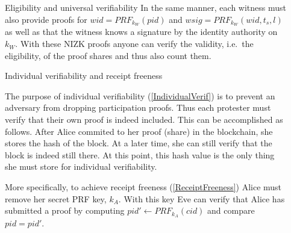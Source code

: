 \begin{columns}[t]
\begin{column}{0.32\linewidth}
\begin{blackblock}{Eligibility and universal verifiability}
In the same manner, each witness must also provide  proofs for \(wid = 
  PRF_{k_W}(pid)\) and \(wsig = PRF_{k_W}(wid, t_s, l)\) as well as that the 
witness knows a signature by the identity authority on \(k_W\).
With these \ac{NIZK} proofs anyone can verify the validity, i.e.\ the 
eligibility, of the proof shares and thus also count them.

\end{blackblock}

\begin{blackblock}{Individual verifiability and receipt freeness}

The purpose of individual verifiability (\cref{IndividualVerif}) is to prevent 
an adversary from dropping participation proofs.
Thus each protester must verify that their own proof is indeed included.
This can be accomplished as follows.
After Alice commited to her proof (share) in the blockchain, she stores the hash 
of the block.
At a later time, she can still verify that the block is indeed still there.
At this point, this hash value is the only thing she must store for individual 
verifiability.

More specifically, to achieve receipt freeness (\cref{ReceiptFreeness}) Alice 
must remove her secret PRF key, \(k_A\).
With this key Eve can verify that Alice has submitted a proof by computing 
\(pid'\gets PRF_{k_A}(cid)\) and compare \(pid = pid'\).

\end{blackblock}

  \end{column}

  \hfill

  \begin{column}{0.32\linewidth}

    \begin{figure}
      \centering
\end{figure}
\end{column}
\end{columns}

